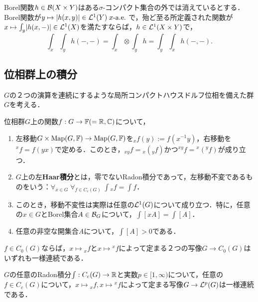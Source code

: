 \documentclass[uplatex,dvipdfmx]{jsreport}
\begin{document}
\begin{corollary}[Tonelli]
    Borel関数$h\in\mathcal{B}(X\times Y)$はある$\sigma$-コンパクト集合の外では消えているとする．
    Borel関数が$y\mapsto\lvert h(x,y)\rvert\in\mathcal{L}^1(Y)\;x\text{-}\mathrm{a.e.}\;$で，殆ど至る所定義された関数が$x\mapsto\int_y\lvert h(x,-)\rvert\in\mathcal{L}^1(X)$を満たすならば，$h\in\mathcal{L}^1(X\times Y)$で，
    \[\int_x\int_yh(-,-)=\int_x\otimes\int_yh=\int_y\int_xh(-,-).\]
\end{corollary}

\subsection{位相群上の積分}

\begin{tcolorbox}[colframe=ForestGreen, colback=ForestGreen!10!white,breakable,colbacktitle=ForestGreen!40!white,coltitle=black,fonttitle=\bfseries\sffamily,
title=]
    $G$の２つの演算を連続にするような局所コンパクトハウスドルフ位相を備えた群$G$を考える．
\end{tcolorbox}

\begin{definition}
    位相群$G$上の関数$f:G\to\mathbb{F}(=\mathbb{R},\mathbb{C})$について，
    \begin{enumerate}
        \item 左移動$G\times\mathrm{Map}(G,\mathbb{F})\to\mathrm{Map}(G,\mathbb{F})$を${}_xf(y):=f(x^{-1}y)$，右移動を${}^xf=f(yx)$で定める．このとき，${}_{xy}f={}_x({}_yf)$かつ${}^{xy}f={}^x({}^yf)$が成り立つ．
        \item $G$上の左\textbf{Haar積分}とは，零でないRadon積分であって，左移動不変であるものをいう：$\forall_{x\in G}\;\forall_{f\in C_c(G)}\;\int{}_xf=\int f$．
        \item このとき，移動不変性は実際は任意の$\mathcal{L}^1(G)$について成り立つ．特に，任意の$x\in G$とBorel集合$A\in\mathcal{B}_G$について，$\int[xA]=\int[A]$．
        \item 任意の非空な開集合$A$について，$\int[A]>0$である．
    \end{enumerate}
\end{definition}

\begin{lemma}
    $f\in C_0(G)$ならば，$x\mapsto {}_xf$と$x\mapsto{}^xf$によって定まる２つの写像$G\to C_0(G)$はいずれも一様連続である．
\end{lemma}

\begin{lemma}
    $G$の任意のRadon積分$\int:C_c(G)\to\mathbb{R}$と実数$p\in[1,\infty)$について，任意の$f\in C_c(G)$について，$x\mapsto{}_xf,x\mapsto{}^xf$によって定まる写像$G\to\mathcal{L}^p(G)$は一様連続である．
\end{lemma}
\end{document}
